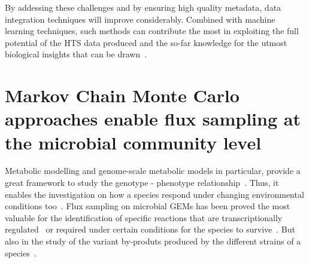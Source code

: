       By addessing these challenges and by ensuring high quality metadata,
      data integration techniques will improve considerably. 
      Combined with machine learning techniques, such methods 
      can contribute the most in exploiting the
      full potential of the HTS data produced
      and the so-far knowledge
      for the utmost biological insights that can be drawn~\citep{noor2019biological}.

\section{Markov Chain Monte Carlo approaches enable flux sampling at the microbial community level}
\label{concl:fluxes}

   Metabolic modelling and genome-scale metabolic models in particular, 
   provide a great framework to study the genotype - phenotype relationship~\citep{lewis2012constraining}.
   Thus, it enables the investigation on how a species respond under changing environmental conditions 
   too~\citep{herrmann2019flux}. 
   Flux sampling on microbial GEMs has been proved the most valuable for 
   the identification of specific reactions that are transcriptionally regulated~\citep{Bordel10}
   or required under certain conditions for the species to survive~\citep{herrmann2019flux}.
   But also in the study of the variant by-produts produced by the different strains of a 
   species~\citep{scott2021metabolic}.

